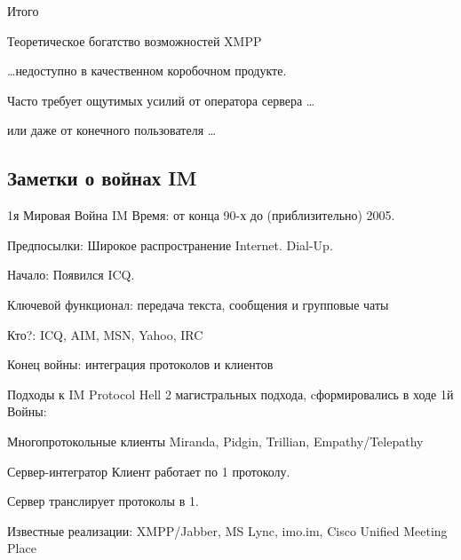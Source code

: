 \begin{frame}{Итого}
  \begin{block}{Теоретическое богатство возможностей XMPP}
  \end{block}

  \pause

  \begin{block}{\ldots недоступно в качественном коробочном продукте.}
  \end{block}

  \pause

  \begin{block}{Часто требует ощутимых усилий от оператора сервера \ldots}
  \end{block}
  
  \pause

  \begin{block}{или даже от конечного пользователя \ldots}
  \end{block}
\end{frame}

\subsection{Заметки о войнах IM}

\begin{frame}{1я Мировая Война IM}
    \alert{Время}: от конца 90-х до (приблизительно) 2005. 

    \alert{Предпосылки}: Широкое распространение Internet. Dial-Up. 
    
    \alert{Начало}: Появился ICQ. 
      
    \alert{Ключевой функционал}: передача текста, сообщения и групповые чаты

    \alert{Кто?}: ICQ, AIM, MSN, Yahoo, IRC

    \alert{Конец войны}: интеграция протоколов и клиентов
\end{frame}

\begin{frame}{Подходы к IM Protocol Hell}
  2 магистральных подхода, cформировались в ходе 1й Войны:

  \begin{block}{Многопротокольные клиенты}
    Miranda, Pidgin, Trillian, Empathy/Telepathy
  \end{block}

  \pause

  \begin{block}{Сервер-интегратор}
    Клиент работает по 1 протоколу. 
    
    Сервер транслирует протоколы в 1.

    Известные реализации: XMPP/Jabber, MS Lync, imo.im, Cisco Unified Meeting Place
  \end{block}

\end{frame}

